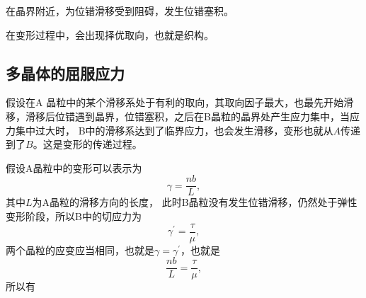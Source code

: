             在晶界附近，为位错滑移受到阻碍，发生位错塞积。

            在变形过程中，会出现择优取向，也就是织构。
        \subsection{多晶体的屈服应力}
            假设在A 晶粒中的某个滑移系处于有利的取向，其取向因子最大，也最先开始滑
            移，滑移后位错遇到晶界，位错塞积，之后在B晶粒的晶界处产生应力集中，当应力集中过大时，
            B中的滑移系达到了临界应力，也会发生滑移，变形也就从$A$传递到了$B$。这是变形的传递过程。

            假设A晶粒中的变形可以表示为
            \begin{equation}
                \gamma=\frac{nb}{L},
            \end{equation}
            其中$L$为A晶粒的滑移方向的长度，
            此时B晶粒没有发生位错滑移，仍然处于弹性变形阶段，所以B中的切应力为
            \begin{equation}
                \gamma^{\prime}=\frac{\tau}{\mu},
            \end{equation}
            两个晶粒的应变应当相同，也就是$\gamma=\gamma^{\prime}$，也就是
            \begin{equation}
                \frac{nb}{L}=\frac{\tau}{\mu},
            \end{equation}
            所以有
